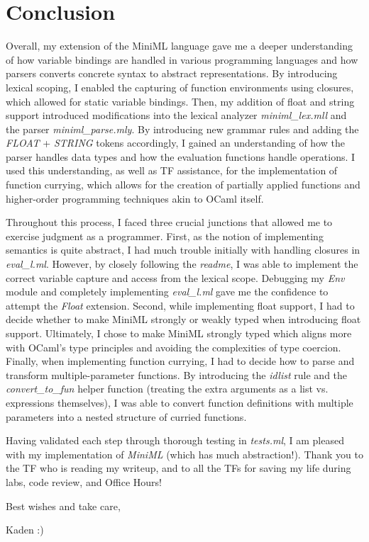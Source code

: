 \documentclass[12pt]{article}
\begin{document}
\section*{Conclusion}
Overall, my extension of the MiniML language gave me a deeper understanding of how variable bindings are handled in various programming languages and how parsers converts concrete syntax to abstract representations. By introducing lexical scoping, I enabled the capturing of function environments using closures, which allowed for static variable bindings. Then, my addition of float and string support introduced modifications into the lexical analyzer \textit{miniml\_lex.mll} and the parser \textit{miniml\_parse.mly}. By introducing new grammar rules and adding the \textit{FLOAT} + \textit{STRING} tokens accordingly, I gained an understanding of how the parser handles data types and how the evaluation functions handle operations. I used this understanding, as well as TF assistance, for the implementation of function currying, which allows for the creation of partially applied functions and higher-order programming techniques akin to OCaml itself.

Throughout this process, I faced three crucial junctions that allowed me to exercise judgment as a programmer. First, as the notion of implementing semantics is quite abstract, I had much trouble initially with handling closures in \textit{eval\_l.ml}. However, by closely following the \textit{readme}, I was able to implement the correct variable capture and access from the lexical scope. Debugging my \textit{Env} module and completely implementing \textit{eval\_l.ml} gave me the confidence to attempt the \textit{Float} extension. Second, while implementing float support, I had to decide whether to make MiniML strongly or weakly typed when introducing float support. Ultimately, I chose to make MiniML strongly typed which aligns more with OCaml's type principles and avoiding the complexities of type coercion. Finally, when implementing function currying, I had to decide how to parse and transform multiple-parameter functions. By introducing the \textit{idlist} rule and the \textit{convert\_to\_fun} helper function (treating the extra arguments as a list vs. expressions themselves), I was able to convert function definitions with multiple parameters into a nested structure of curried functions.

Having validated each step through thorough testing in \textit{tests.ml}, I am pleased with my implementation of \textit{MiniML} (which has much abstraction!). Thank you to the TF who is reading my writeup, and to all the TFs for saving my life during labs, code review, and Office Hours!

\begin{center}
Best wishes and take care,

Kaden :)
\end{center}
\end{document}
